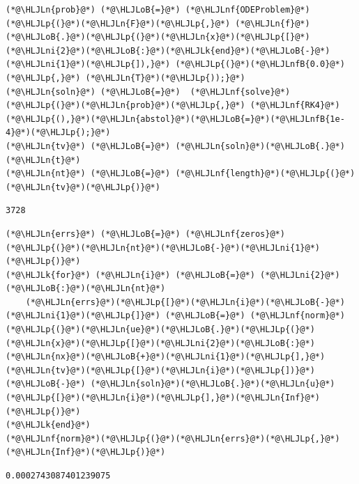 \documentclass[12pt,a4paper]{article}
\newcommand{\HLJLk}[1]{\textcolor[RGB]{148,91,176}{\textbf{#1}}}
\newcommand{\HLJLn}[1]{#1}
\newcommand{\HLJLnf}[1]{\textcolor[RGB]{66,102,213}{#1}}
\newcommand{\HLJLnfB}[1]{\textcolor[RGB]{59,151,46}{#1}}
\newcommand{\HLJLni}[1]{\textcolor[RGB]{59,151,46}{#1}}
\newcommand{\HLJLoB}[1]{\textcolor[RGB]{102,102,102}{\textbf{#1}}}
\newcommand{\HLJLp}[1]{#1}
\begin{document}
\begin{lstlisting}
(*@\HLJLn{prob}@*) (*@\HLJLoB{=}@*) (*@\HLJLnf{ODEProblem}@*)(*@\HLJLp{(}@*)(*@\HLJLn{F}@*)(*@\HLJLp{,}@*) (*@\HLJLn{f}@*)(*@\HLJLoB{.}@*)(*@\HLJLp{(}@*)(*@\HLJLn{x}@*)(*@\HLJLp{[}@*)(*@\HLJLni{2}@*)(*@\HLJLoB{:}@*)(*@\HLJLk{end}@*)(*@\HLJLoB{-}@*)(*@\HLJLni{1}@*)(*@\HLJLp{]),}@*) (*@\HLJLp{(}@*)(*@\HLJLnfB{0.0}@*)(*@\HLJLp{,}@*) (*@\HLJLn{T}@*)(*@\HLJLp{));}@*)
(*@\HLJLn{soln}@*) (*@\HLJLoB{=}@*)  (*@\HLJLnf{solve}@*)(*@\HLJLp{(}@*)(*@\HLJLn{prob}@*)(*@\HLJLp{,}@*) (*@\HLJLnf{RK4}@*)(*@\HLJLp{(),}@*)(*@\HLJLn{abstol}@*)(*@\HLJLoB{=}@*)(*@\HLJLnfB{1e-4}@*)(*@\HLJLp{);}@*)
(*@\HLJLn{tv}@*) (*@\HLJLoB{=}@*) (*@\HLJLn{soln}@*)(*@\HLJLoB{.}@*)(*@\HLJLn{t}@*)
(*@\HLJLn{nt}@*) (*@\HLJLoB{=}@*) (*@\HLJLnf{length}@*)(*@\HLJLp{(}@*)(*@\HLJLn{tv}@*)(*@\HLJLp{)}@*)
\end{lstlisting}

\begin{lstlisting}
3728
\end{lstlisting}


\begin{lstlisting}
(*@\HLJLn{errs}@*) (*@\HLJLoB{=}@*) (*@\HLJLnf{zeros}@*)(*@\HLJLp{(}@*)(*@\HLJLn{nt}@*)(*@\HLJLoB{-}@*)(*@\HLJLni{1}@*)(*@\HLJLp{)}@*)
(*@\HLJLk{for}@*) (*@\HLJLn{i}@*) (*@\HLJLoB{=}@*) (*@\HLJLni{2}@*)(*@\HLJLoB{:}@*)(*@\HLJLn{nt}@*)
    (*@\HLJLn{errs}@*)(*@\HLJLp{[}@*)(*@\HLJLn{i}@*)(*@\HLJLoB{-}@*)(*@\HLJLni{1}@*)(*@\HLJLp{]}@*) (*@\HLJLoB{=}@*) (*@\HLJLnf{norm}@*)(*@\HLJLp{(}@*)(*@\HLJLn{ue}@*)(*@\HLJLoB{.}@*)(*@\HLJLp{(}@*)(*@\HLJLn{x}@*)(*@\HLJLp{[}@*)(*@\HLJLni{2}@*)(*@\HLJLoB{:}@*)(*@\HLJLn{nx}@*)(*@\HLJLoB{+}@*)(*@\HLJLni{1}@*)(*@\HLJLp{],}@*)(*@\HLJLn{tv}@*)(*@\HLJLp{[}@*)(*@\HLJLn{i}@*)(*@\HLJLp{])}@*) (*@\HLJLoB{-}@*) (*@\HLJLn{soln}@*)(*@\HLJLoB{.}@*)(*@\HLJLn{u}@*)(*@\HLJLp{[}@*)(*@\HLJLn{i}@*)(*@\HLJLp{],}@*)(*@\HLJLn{Inf}@*)(*@\HLJLp{)}@*)
(*@\HLJLk{end}@*)
(*@\HLJLnf{norm}@*)(*@\HLJLp{(}@*)(*@\HLJLn{errs}@*)(*@\HLJLp{,}@*)(*@\HLJLn{Inf}@*)(*@\HLJLp{)}@*)
\end{lstlisting}

\begin{lstlisting}
0.0002743087401239075
\end{lstlisting}
\end{document}
